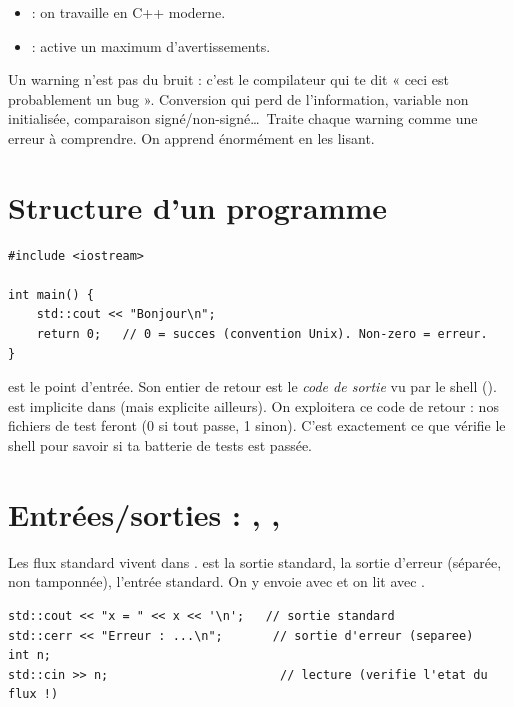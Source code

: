 \documentclass[11pt]{article}
\begin{document}
\begin{itemize}[noitemsep]
    \item {} : on travaille en C++ moderne.
    \item {} : active un maximum d'avertissements.
\end{itemize}

\begin{aretenir}
Un warning n'est pas du bruit : c'est le compilateur qui te dit « ceci est
probablement un bug ». Conversion qui perd de l'information, variable non
initialisée, comparaison signé/non-signé\ldots\ Traite chaque warning comme une
erreur à comprendre. On apprend énormément en les lisant.
\end{aretenir}

\section{Structure d'un programme}

\begin{lstlisting}
#include <iostream>

int main() {
    std::cout << "Bonjour\n";
    return 0;   // 0 = succes (convention Unix). Non-zero = erreur.
}
\end{lstlisting}

 est le point d'entrée. Son entier de retour est le \emph{code de
sortie} vu par le shell ().  est implicite dans
 (mais explicite ailleurs). On exploitera ce code de retour : nos
fichiers de test feront  (0 si tout passe, 1
sinon). C'est exactement ce que vérifie le shell pour savoir si ta batterie de
tests est passée.

\section{Entrées/sorties : , , }

Les flux standard vivent dans .  est la sortie
standard,  la sortie d'erreur (séparée, non tamponnée),
 l'entrée standard. On y envoie avec \code{<<} et on lit avec
\code{>>}.

\begin{lstlisting}
std::cout << "x = " << x << '\n';   // sortie standard
std::cerr << "Erreur : ...\n";       // sortie d'erreur (separee)
int n;
std::cin >> n;                        // lecture (verifie l'etat du flux !)
\end{lstlisting}
\end{document}
